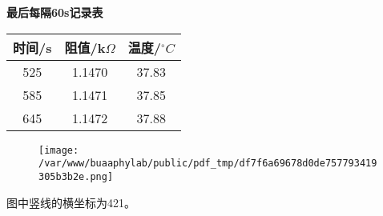 \documentclass[11pt,a4paper,oneside]{article}
\begin{document}
\vspace{1.5cm}
\textbf{最后每隔60s记录表}
\begin{tabular}{|c|c|c|}
\hline 
时间/s & 阻值/k$\Omega$ & 温度/$^{\circ}C$
\\
\hline

525 & 1.1470 & 37.83
\\
\hline

585 & 1.1471 & 37.85
\\
\hline

645 & 1.1472 & 37.88
\\
\hline

\end{tabular}

\begin{figure}[H]
 \centering
  \texttt{[image: /var/www/buaaphylab/public/pdf\_tmp/df7f6a69678d0de757793419305b3b2e.png]}
\end{figure}

图中竖线的横坐标为421。
\end{document}
